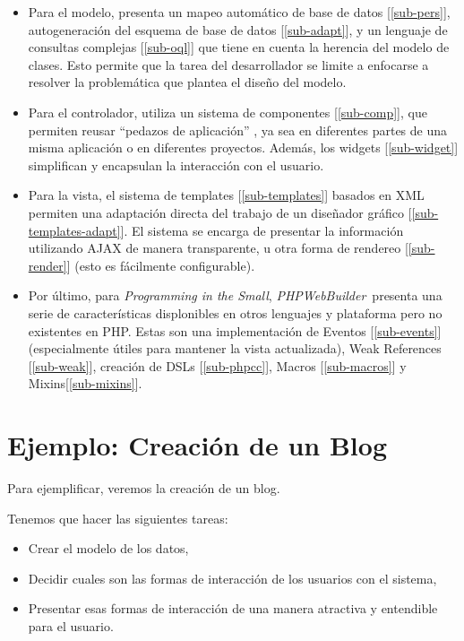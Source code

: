 \documentclass[a4paper,10pt]{article}
\newcommand{\PITS}{\emph{Programming in the Small}} %
\newcommand{\PWB}{\emph{PHPWebBuilder}}
\begin{document}
\begin{itemize}
\item Para el modelo, presenta un mapeo automático de base de datos [\ref{sub-pers}], autogeneración del esquema de base de datos [\ref{sub-adapt}], y un lenguaje de consultas complejas [\ref{sub-oql}] que tiene en cuenta la herencia del modelo de clases.  Esto permite que la tarea del desarrollador se limite a enfocarse a resolver la problemática que plantea el diseño del modelo.

\item Para el controlador, utiliza un sistema de componentes [\ref{sub-comp}], que permiten reusar ``pedazos de aplicación'' , ya sea en diferentes partes de una misma aplicación o en diferentes proyectos. Además, los widgets [\ref{sub-widget}] simplifican y encapsulan la interacción con el usuario.

\item Para la vista, el sistema de templates [\ref{sub-templates}] basados en XML permiten una adaptación directa del trabajo de un diseñador gráfico [\ref{sub-templates-adapt}]. El sistema se encarga de presentar la información utilizando AJAX de manera transparente, u otra forma de rendereo [\ref{sub-render}] (esto es fácilmente configurable).

\item Por último, para \PITS, \PWB \ presenta una serie de características displonibles en otros lenguajes y plataforma pero no existentes en PHP. Estas son una implementación de Eventos [\ref{sub-events}] (especialmente útiles para mantener la vista actualizada), Weak References [\ref{sub-weak}], creación de DSLs [\ref{sub-phpcc}], Macros [\ref{sub-macros}] y Mixins[\ref{sub-mixins}].

\end{itemize}

\section{Ejemplo: Creación de un Blog}
Para ejemplificar, veremos la creación de un blog.

Tenemos que hacer las siguientes tareas:
\begin{itemize}
\item Crear el modelo de los datos,
\item Decidir cuales son las formas de interacción de los usuarios con el sistema,
\item Presentar esas formas de interacción de una manera atractiva y entendible para el usuario.
\end{itemize}

\end{document}
